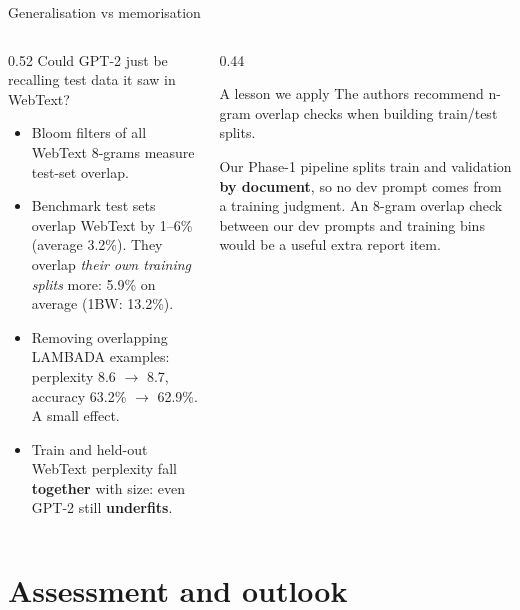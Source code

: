 \documentclass[aspectratio=169,11pt]{beamer}
\begin{document}
\begin{frame}{Generalisation vs memorisation}
  \begin{columns}[T]
    \begin{column}{0.52\textwidth}
      \small
      Could GPT-2 just be recalling test data it saw in WebText?
      \begin{itemize}
        \item Bloom filters of all WebText 8-grams measure test-set overlap.
        \item Benchmark test sets overlap WebText by 1--6\% (average 3.2\%). They overlap \emph{their own training splits} more: 5.9\% on average (1BW: 13.2\%).
        \item Removing overlapping LAMBADA examples: perplexity 8.6 $\to$ 8.7, accuracy 63.2\% $\to$ 62.9\%. A small effect.
        \item Train and held-out WebText perplexity fall \textbf{together} with size: even GPT-2 still \textbf{underfits}.
      \end{itemize}
    \end{column}
    \begin{column}{0.44\textwidth}
      \begin{alertblock}{A lesson we apply}
        \small
        The authors recommend n-gram overlap checks when building train/test splits.
        \vspace{1mm}

        Our Phase-1 pipeline splits train and validation \textbf{by document}, so no dev prompt comes from a training judgment. An 8-gram overlap check between our dev prompts and training bins would be a useful extra report item.
      \end{alertblock}
    \end{column}
  \end{columns}
\end{frame}

\section{Assessment and outlook}
\end{document}
